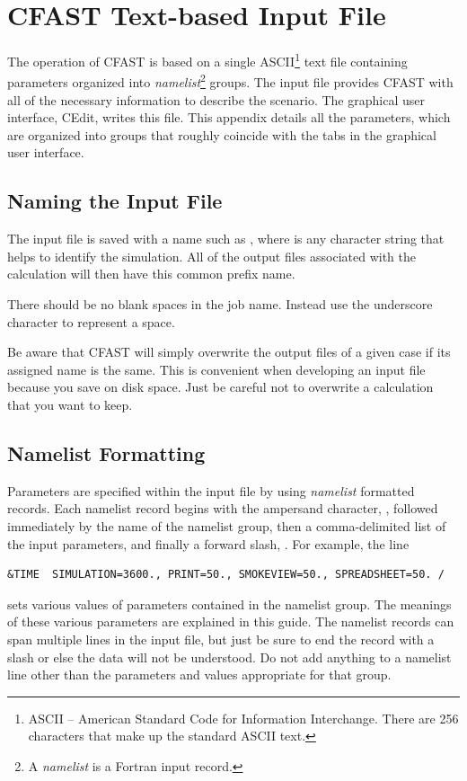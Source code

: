 
\chapter{CFAST Text-based Input File}

The operation of CFAST is based on a single ASCII\footnote{ASCII -- American Standard Code for Information Interchange. There are 256 characters that make up the standard ASCII text.} text file containing parameters organized into {\em namelist}\footnote{A {\em namelist} is a Fortran input record.} groups.
The input file provides CFAST  with all of the necessary information to describe the scenario. The graphical user interface, CEdit, writes this file. This appendix details all the parameters, which are organized into groups that roughly coincide with the tabs in the graphical user interface.

\section{Naming the Input File}

The input file is saved with a name such as , where  is any character string that helps to identify the simulation. All of the output files associated with the calculation will then have this common prefix name.

There should be no blank spaces in the job name. Instead use the underscore character to represent a space.

Be aware that CFAST will simply overwrite the output files of a given case if its assigned name is the same. This is convenient when developing an input file because you save on disk space. Just be careful not to overwrite a calculation that you want to keep.

\section{Namelist Formatting}

Parameters are specified within the input file by using {\em namelist} formatted records. Each namelist record begins with the ampersand character, \ct{&}, followed immediately by the name of the namelist group, then a comma-delimited list of the input parameters, and finally a forward slash, \ct{/}. For example, the line
\begin{lstlisting}
&TIME  SIMULATION=3600., PRINT=50., SMOKEVIEW=50., SPREADSHEET=50. /
\end{lstlisting}
sets various values of parameters contained in the  namelist group. The meanings of these various parameters are explained in this guide. The namelist records can span multiple lines in the input file, but just be sure to end the record with a slash or else the data will not be understood. Do not add anything to a namelist line other than the parameters and values appropriate for that group.


